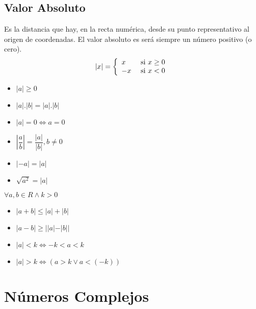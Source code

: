 \documentclass[10pt]{article}
\begin{document}
\subsection{Valor Absoluto}
Es la distancia que hay, en la recta numérica, desde su punto representativo al origen de coordenadas. El valor absoluto es será siempre un número positivo (o cero).
\[|x| = \left\{ \begin{array}{ll}
x  &$ si $x \geq 0\\
-x &$ si $x < 0\\
\end{array}\right.\]
\begin{multicols}{2}
\begin{itemize}
\item $|a| \geq 0$
\item $|a|.|b| = |a|.|b|$
\item $|a|=0 \iff a=0$
\item $\left|\dfrac{a}{b}\right| = \dfrac{|a|}{|b|}, b \not = 0$
\item $|-a| = |a|$
\item $\sqrt{a^2} = |a|$
\end{itemize}
\end{multicols}
$\forall a, b \in R \land k>0$
\begin{multicols}{2}
\begin{itemize}
\item $|a+b| \leq |a| + |b|$
\item $|a-b| \geq ||a|-|b||$
\item $|a|<k \iff -k < a < k$
\item $|a|>k \iff (a>k \lor a<(-k))$
\end{itemize}
\end{multicols}

\newpage
\section{Números Complejos}
\end{document}
